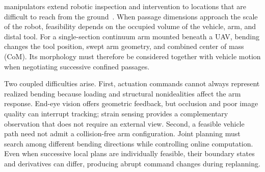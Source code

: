 \documentclass[journal,twoside]{IEEEtran}
\begin{document}





 manipulators extend robotic inspection and intervention to locations that are difficult to reach from the ground~\cite{ollero2022survey}. When passage dimensions approach the scale of the robot, feasibility depends on the occupied volume of the vehicle, arm, and distal tool. For a single-section continuum arm mounted beneath a UAV, bending changes the tool position, swept arm geometry, and combined center of mass (CoM). Its morphology must therefore be considered together with vehicle motion when negotiating successive confined passages.

Two coupled difficulties arise. First, actuation commands cannot always represent realized bending because loading and structural nonidealities affect the arm response. End-eye vision offers geometric feedback, but occlusion and poor image quality can interrupt tracking; strain sensing provides a complementary observation that does not require an external view. Second, a feasible vehicle path need not admit a collision-free arm configuration. Joint planning must search among different bending directions while controlling online computation. Even when successive local plans are individually feasible, their boundary states and derivatives can differ, producing abrupt command changes during replanning.
\end{document}
